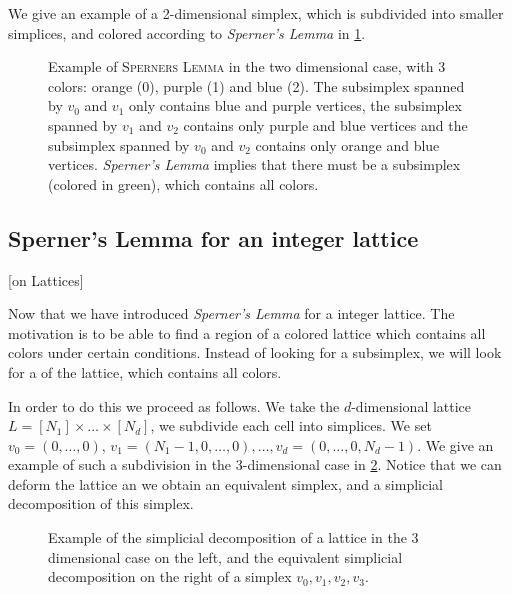 We give an example of a 2-dimensional simplex, which is subdivided into smaller simplices, and colored according to \textit{Sperner's Lemma} in \cref{fig:sperner_lemma_example}.

\begin{figure}[ht]
    \centering
    \caption[Example of \textsc{Sperners Lemma}]{Example of \textsc{Sperners Lemma} in the two dimensional case, with 3 colors: orange (0), purple (1) and blue (2). The subsimplex spanned by $v_0$ and $v_1$ only contains blue and purple vertices, the subsimplex spanned by $v_1$ and $v_2$ contains only purple and blue vertices and the subsimplex spanned by $v_0$ and $v_2$ contains only orange and blue vertices. \textit{Sperner's Lemma} implies that there must be a subsimplex (colored in green), which contains all colors.}
    \label{fig:sperner_lemma_example}
\end{figure}

\subsection{Sperner's Lemma for an integer lattice}[on Lattices]

Now that we have introduced \textit{Sperner's Lemma} for a integer lattice. The motivation is to be able to find a region of a colored lattice which contains all colors under certain conditions. Instead of looking for a subsimplex, we will look for a  of the lattice, which contains all colors.

In order to do this we proceed as follows. We take the $d$-dimensional lattice $L = [N_1] \times \dots \times [N_d]$, we subdivide each cell into simplices. We set $v_0 = (0, \dots, 0)$, $v_1 = (N_1 - 1, 0, \dots, 0), \dots, v_d = (0, \dots, 0, N_d - 1)$. We give an example of such a subdivision in the 3-dimensional case in \cref{fig:sperner_lattice_example}. Notice that we can deform the lattice an we obtain an equivalent simplex, and a simplicial decomposition of this simplex.

\begin{figure}
    \centering
    \caption[Example of a simplicial decomposition of a lattice]{Example of the simplicial decomposition of a lattice in the 3 dimensional case on the left, and the equivalent simplicial decomposition on the right of a simplex $v_0, v_1, v_2, v_3$.}
    \label{fig:sperner_lattice_example}
\end{figure}

